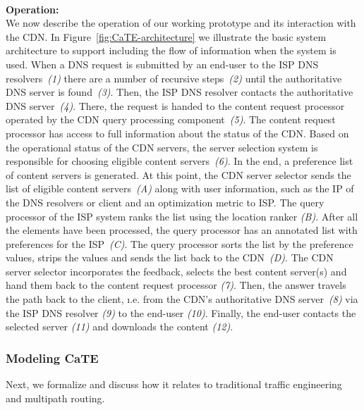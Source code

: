 \ \\\noindent\textbf{Operation:}\label{sec:operation:}\\\noindent
We now describe the operation of our working prototype and its interaction with
the CDN.  In Figure~\ref{fig:CaTE-architecture} we illustrate the basic system
architecture to support \cate including the flow of information when the \cate
system is used. When a DNS request is submitted by an end-user to the ISP DNS
resolvers~{\it(1)} there are a number of recursive steps~{\it(2)} until the
authoritative DNS server is found~{\it(3)}.  Then, the ISP DNS resolver
contacts the authoritative DNS server~{\it(4)}.  There, the request is handed
to the content request processor operated by the CDN query processing
component~{\it(5)}. The content request processor has access to full
information about the status of the CDN.  Based on the operational status of
the CDN servers, the server selection system \cite{Akamai-Network} is
responsible for choosing eligible content servers~{\it(6)}.  In the end, a
preference list of content servers is generated. At this point, the CDN server
selector sends the list of eligible content servers~{\it(A)} along with user
information, such as the IP of the DNS resolvers or client and an optimization
metric to ISP.  The query processor of the ISP system ranks the list using the
location ranker {\it(B)}.  After all the elements have been processed, the
query processor has an annotated list with preferences for the ISP~{\it(C)}.
The query processor sorts the list by the preference values, strips the values
and sends the list back to the CDN~{\it(D)}. The CDN server selector
incorporates the feedback, selects the best content server(s) and hand them
back to the content request processor {\it(7)}.  Then, the answer travels the
path back to the client, \i.e. from the CDN's authoritative DNS server~{\it(8)}
via the ISP DNS resolver {\it(9)} to the end-user {\it(10)}.  Finally, the
end-user contacts the selected server {\it(11)} and downloads the content
{\it(12)}.


\subsubsection{Modeling CaTE}\label{sec:model-CaTE}

Next, we formalize \cate and discuss how it relates to traditional traffic
engineering and multipath routing.

